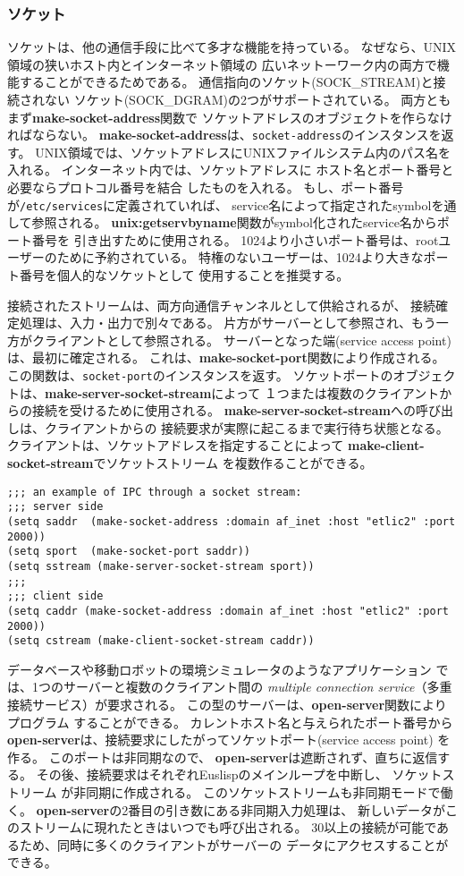 \subsubsection{ソケット}
ソケットは、他の通信手段に比べて多才な機能を持っている。
なぜなら、UNIX領域の狭いホスト内とインターネット領域の
広いネットーワーク内の両方で機能することができるためである。
通信指向のソケット(SOCK\_STREAM)と接続されない
ソケット(SOCK\_DGRAM)の2つがサポートされている。
両方ともまず{\bf make-socket-address}関数で
ソケットアドレスのオブジェクトを作らなければならない。
{\bf make-socket-address}は、{\tt socket-address}のインスタンスを返す。
UNIX領域では、ソケットアドレスにUNIXファイルシステム内のパス名を
入れる。
インターネット内では、ソケットアドレスに
ホスト名とポート番号と必要ならプロトコル番号を結合
したものを入れる。
もし、ポート番号が{\tt /etc/services}に定義されていれば、
service名によって指定されたsymbolを通して参照される。
{\bf unix:getservbyname}関数がsymbol化されたservice名からポート番号を
引き出すために使用される。
1024より小さいポート番号は、rootユーザーのために予約されている。
特権のないユーザーは、1024より大きなポート番号を個人的なソケットとして
使用することを推奨する。

接続されたストリームは、両方向通信チャンネルとして供給されるが、
接続確定処理は、入力・出力で別々である。
片方がサーバーとして参照され、もう一方がクライアントとして参照される。
サーバーとなった端(service access point)は、最初に確定される。
これは、{\bf make-socket-port}関数により作成される。
この関数は、{\tt socket-port}のインスタンスを返す。
ソケットポートのオブジェクトは、{\bf make-server-socket-stream}によって
１つまたは複数のクライアントからの接続を受けるために使用される。
{\bf make-server-socket-stream}への呼び出しは、クライアントからの
接続要求が実際に起こるまで実行待ち状態となる。
クライアントは、ソケットアドレスを指定することによって
{\bf make-client-socket-stream}でソケットストリーム
を複数作ることができる。

\begin{verbatim}
;;; an example of IPC through a socket stream:
;;; server side
(setq saddr  (make-socket-address :domain af_inet :host "etlic2" :port 2000))
(setq sport  (make-socket-port saddr))
(setq sstream (make-server-socket-stream sport))
;;;
;;; client side
(setq caddr (make-socket-address :domain af_inet :host "etlic2" :port 2000))
(setq cstream (make-client-socket-stream caddr))
\end{verbatim}

データベースや移動ロボットの環境シミュレータのようなアプリケーション
では、1つのサーバーと複数のクライアント間の
{\em multiple connection service}（多重接続サービス）が要求される。
この型のサーバーは、{\bf open-server}関数によりプログラム
することができる。
カレントホスト名と与えられたポート番号から
{\bf open-server}は、接続要求にしたがってソケットポート(service access point)
を作る。
このポートは非同期なので、
{\bf open-server}は遮断されず、直ちに返信する。
その後、接続要求はそれぞれEuslispのメインループを中断し、
ソケットストリーム が非同期に作成される。
このソケットストリームも非同期モードで働く。
{\bf open-server}の2番目の引き数にある非同期入力処理は、
新しいデータがこのストリームに現れたときはいつでも呼び出される。
30以上の接続が可能であるため、同時に多くのクライアントがサーバーの
データにアクセスすることができる。

